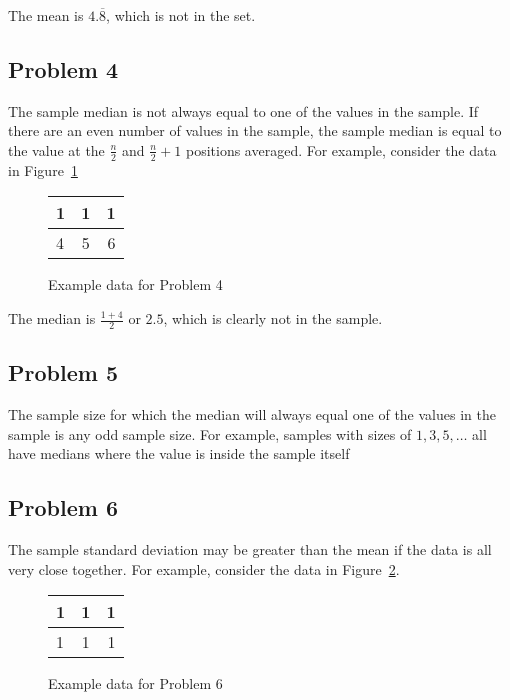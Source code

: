\documentclass[11pt]{article}
\begin{document}
The mean is $4.\overline{8}$, which is not in the set. 

\subsection*{Problem 4}
The sample median is not always equal to one of the values in the sample. If
there are an even number of values in the sample, the sample median is equal to
the value at the $\frac{n}{2}$ and $\frac{n}{2} + 1$ positions averaged. For
example, consider the data in Figure~\ref{fig:example3} 

\begin{figure}[h]
    \centering
    \begin{tabular}{|l|c|r|} %
        \hline %
        1 & 1 & 1 \\
        \hline %
        4 & 5 & 6 \\
        \hline %
    \end{tabular}
    \caption{Example data for Problem 4}
\label{fig:example3}
\end{figure}

The median is $\frac{1+4}{2}$ or $2.5$, which is clearly not in the sample. 

\subsection*{Problem 5}
The sample size for which the median will always equal one of the values in the
sample is any odd sample size. For example, samples with sizes of $1, 3, 5, \dots$
all have medians where the value is inside the sample itself

\subsection*{Problem 6}
The sample standard deviation may be greater than the mean if the data is all
very close together. For example, consider the data in
Figure~\ref{fig:example4}.

\begin{figure}[h]
    \centering
    \begin{tabular}{|l|c|r|} %
        \hline %
        1 & 1 & 1 \\
        \hline %
        1 & 1 & 1 \\
        \hline %
    \end{tabular}
    \caption{Example data for Problem 6}
\label{fig:example4}
\end{figure}
\end{document}
